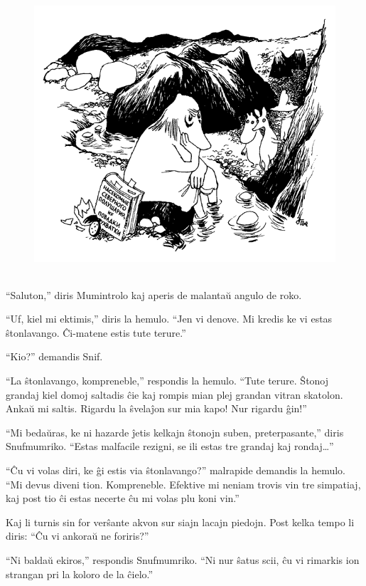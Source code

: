 \begin{figure}[htbp]
\centering
\includegraphics[width=349pt,height=297pt]{5-3.png}
\caption{}
\label{5-3}
\end{figure}

``Saluton,'' diris Mumintrolo kaj aperis de malantaŭ angulo de roko.

``Uf, kiel mi ektimis,'' diris la hemulo. ``Jen vi denove. Mi kredis ke vi estas ŝtonlavango. Ĉi-matene estis tute terure.''

``Kio?'' demandis Snif.

``La ŝtonlavango, kompreneble,'' respondis la hemulo. ``Tute terure. Ŝtonoj grandaj kiel domoj saltadis ĉie kaj rompis mian plej grandan vitran skatolon. Ankaŭ mi saltis. Rigardu la ŝvelaĵon sur mia kapo! Nur rigardu ĝin!''

``Mi bedaŭras, ke ni hazarde ĵetis kelkajn ŝtonojn suben, preterpasante,'' diris Snufmumriko. ``Estas malfacile rezigni, se ili estas tre grandaj kaj rondaj{\ldots}''

``Ĉu vi volas diri, ke ĝi estis via ŝtonlavango?'' malrapide demandis la hemulo. ``Mi devus diveni tion. Kompreneble. Efektive mi neniam trovis vin tre simpatiaj, kaj post tio ĉi estas necerte ĉu mi volas plu koni vin.''

Kaj li turnis sin for verŝante akvon sur siajn lacajn piedojn. Post kelka tempo li diris: ``Ĉu vi ankoraŭ ne foriris?''

``Ni baldaŭ ekiros,'' respondis Snufmumriko. ``Ni nur ŝatus scii, ĉu vi rimarkis ion strangan pri la koloro de la ĉielo.''

